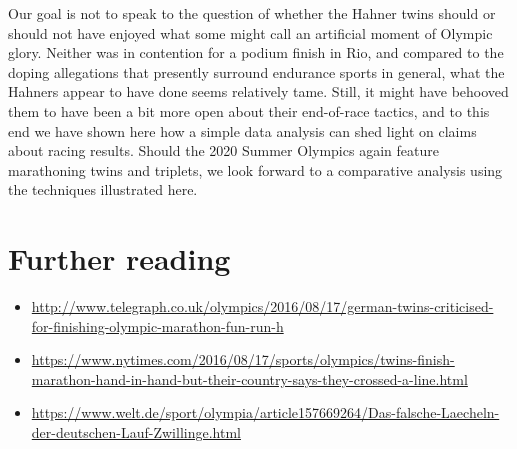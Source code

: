 \documentclass[12pt,titlepage]{article}
\begin{document}
Our goal is not to speak to the question of whether the Hahner twins
should or should not have enjoyed what some might call an artificial
moment of Olympic glory. Neither was in contention for a podium finish
in Rio, and compared to the doping allegations that presently surround
endurance sports in general, what the Hahners appear to have done
seems relatively tame. Still, it might have behooved them to have been
a bit more open about their end-of-race tactics, and to this end we
have shown here how a simple data analysis can shed light on claims
about racing results.  Should the 2020 Summer Olympics again feature
marathoning twins and triplets, we look forward to a comparative
analysis using the techniques illustrated here.





\section*{Further reading}

\begin{itemize}

\item \url{http://www.telegraph.co.uk/olympics/2016/08/17/german-twins-criticised-for-finishing-olympic-marathon-fun-run-h}

\item
  \url{https://www.nytimes.com/2016/08/17/sports/olympics/twins-finish-marathon-hand-in-hand-but-their-country-says-they-crossed-a-line.html}

\item
  \url{https://www.welt.de/sport/olympia/article157669264/Das-falsche-Laecheln-der-deutschen-Lauf-Zwillinge.html}
\end{itemize}
\end{document}

